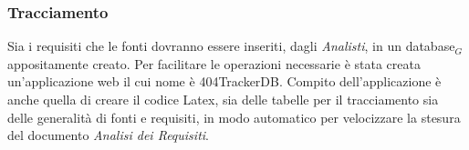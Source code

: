 \subsubsection{Tracciamento}
Sia i requisiti che le fonti dovranno essere inseriti, dagli \textit{Analisti}, in un database$_G$ appositamente creato. Per facilitare le operazioni necessarie è stata creata un'applicazione web il cui nome è 404TrackerDB.
Compito dell'applicazione è anche quella di creare il codice {Latex}, sia delle tabelle per il tracciamento sia delle generalità di fonti e requisiti, in modo automatico per velocizzare la stesura del documento \textit{Analisi dei Requisiti}. 